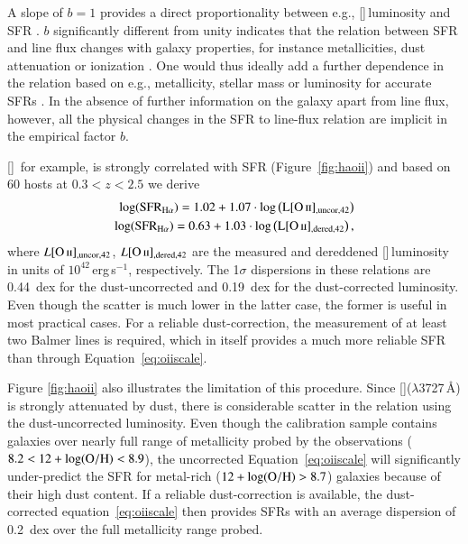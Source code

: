 \documentclass[traditabstract, longauth]{aa}
\newcommand{\oh}{12+\log(\rm{O/H})}
\newcommand{\oii}{[\ion{O}{ii}]}
\begin{document}
A slope of $b=1$ provides a direct proportionality between e.g., \oii\,luminosity and SFR \citep{1998ARA&A..36..189K, 2009ApJ...691..182S}. $b$ significantly different from unity indicates that the relation between SFR and line flux changes with galaxy properties, for instance metallicities, dust attenuation or ionization \citep[e.g.,][]{2004AJ....127.2002K}. One would thus ideally add a further dependence in the relation based on e.g., metallicity, stellar mass or luminosity for accurate SFRs \citep{2004AJ....127.2002K, 2010MNRAS.405.2594G}. In the absence of further information on the galaxy apart from line flux, however, all the physical changes in the SFR to line-flux relation are implicit in the empirical factor $b$.

\oii\, for example, is strongly correlated with SFR (Figure~\ref{fig:haoii}) and based on  {60 hosts at $0.3 < z < 2.5$} we derive
\begin{equation}
\label{eq:oiiscale}
\begin{split}
\log(\rm{SFR_{H\alpha}}) = 1.02 + 1.07\cdot\log\left(L{\oii_{\rm{,uncor,42}}}\right)\\
\log(\rm{SFR_{H\alpha}}) = 0.63 + 1.03\cdot\log\left(L{\oii_{\rm{,dered,42}}}\right),
\end{split}
\end{equation}
where $L{\oii_{\rm{,uncor,42}}}$, $L{\oii_{\rm{,dered,42}}}$ are the measured and dereddened \oii\,luminosity in units of $10^{42}$\,erg\,{s}$^{-1}$, respectively.  The 1$\sigma$ dispersions in these relations are 0.44~dex for the dust-uncorrected and 0.19~dex for the dust-corrected luminosity. Even though the scatter is much lower in the latter case, the former is useful in most practical cases. For a reliable dust-correction, the measurement of at least two Balmer lines is required, which in itself provides a much more reliable SFR than through Equation~\ref{eq:oiiscale}. 

 {Figure \ref{fig:haoii} also illustrates the limitation of this procedure. Since \oii($\lambda$3727\,\AA) is strongly attenuated by dust, there is considerable scatter in the relation using the dust-uncorrected luminosity. Even though the calibration sample contains galaxies over nearly full range of metallicity probed by the observations ($8.2 < \oh < 8.9$), the uncorrected Equation~\ref{eq:oiiscale} will significantly under-predict the SFR for metal-rich ($\oh > 8.7$) galaxies because of their high dust content. If a reliable dust-correction is available, the dust-corrected equation~\ref{eq:oiiscale} then provides SFRs with an average dispersion of 0.2~dex over the full metallicity range probed.}
\end{document}
